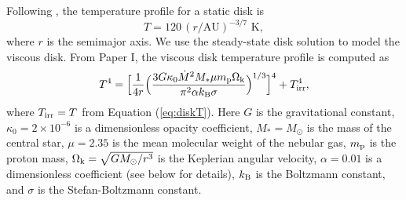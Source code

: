 \documentclass[apj]{emulateapj}
\begin{document}
Following \citet{chiang10}, the temperature profile for a static disk is
\begin{equation}
\label{eq:diskT}
T = 120\, (r/\text{AU})^{-3/7} \,\,\text{K},
\end{equation}
where $r$ is the semimajor axis. We use the \citet{shakura73}  steady-state disk solution to model the viscous disk. From Paper I, the viscous disk temperature profile is computed as %
\begin{equation}
\label{eq:activeT}
T^4 =\Big[\frac{1}{4 r} \Big(\frac{3 G \kappa_0\dot{M}^2 M_* \mu m_{\rm p} \Omega_{\rm k}}{\pi^2 \alpha k_{\rm B} \sigma}\Big)^{1/3}\Big]^4 + T_{\rm irr}^4,
\end{equation}
where $T_{\rm irr}=T$ from Equation (\ref{eq:diskT}). Here $G$ is the gravitational constant, $\kappa_0=2 \times 10^{-6}$ is a dimensionless opacity coefficient, $M_*=M_{\odot}$ is the mass of the central star, $\mu=2.35$ is the mean molecular weight of the nebular gas, $m_{\rm p}$ is the proton mass, $\Omega_{\rm k}=\sqrt{G M_{\odot}/r^3}$ is the Keplerian angular velocity, $\alpha=0.01$ is a dimensionless coefficient (see below for details), $k_{\rm B}$ is the Boltzmann constant, and $\sigma$ is the Stefan-Boltzmann constant. 

\end{document}
